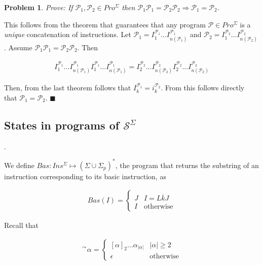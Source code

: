 \documentclass[a4paper, 12pt]{article}
\newtheorem{problem}{Problem}
\newtheorem{problem}{Problem}
\begin{document}
\begin{problem}
    Prove: If $\mathcal{P}_1, \mathcal{P}_2 \in Pro^{\Sigma}$ then $\mathcal{P}_1
    \mathcal{P}_1 = \mathcal{P}_2 \mathcal{P}_2 \Rightarrow \mathcal{P}_1 =
    \mathcal{P}_2$.
\end{problem}

This follows from the theorem that guarantees that any program $\mathcal{P} \in
Pro^{\Sigma}$ is a \textit{unique} concatenation of instructions. Let
$\mathcal{P}_1 = I_1^{\mathcal{P}_1} \ldots I_{n(\mathcal{P}_1)}^{\mathcal{P}_1}$ and $\mathcal{P}_2 = I_1^{\mathcal{P}_2}
\ldots I_{n(\mathcal{P}_2)}^{\mathcal{P}_2}$. Assume $\mathcal{P}_1\mathcal{P}_1 =
\mathcal{P}_2 \mathcal{P}_2$. Then 

\begin{align*}
    I_1^{\mathcal{P}_1} \ldots I_{n(\mathcal{P}_1)}^{\mathcal{P}_1}
    I_1^{\mathcal{P}_1} \ldots I_{n(\mathcal{P}_1)}^{\mathcal{P}_1} = 
    I_2^{\mathcal{P}_2} \ldots I_{n(\mathcal{P}_2)}^{\mathcal{P}_2}
    I_2^{\mathcal{P}_2} \ldots I_{n(\mathcal{P}_2)}^{\mathcal{P}_2}
\end{align*}

Then, from the last theorem follows that $I_k^{\mathcal{P}_1} =
i_k^{\mathcal{P}_2}$. From this follows directly that $\mathcal{P}_1 =
\mathcal{P}_2$. $\blacksquare$

\subsection{States in programs of $\mathcal{S}^{\Sigma}$}.

We define $Bas : Ins^{\Sigma} \mapsto (\Sigma \cup \Sigma_p)^{*}$, the program
that returns the substring of an instruction corresponding to its basic
instruction, as 

\begin{align*}
    Bas(I) = \begin{cases}
        J & I = L \overline{k} J \\ 
        I & \text{otherwise}
    \end{cases}
\end{align*}

Recall that 

\begin{align*}
    {}^{\curvearrowright} \alpha = \begin{cases}
        [\alpha]_2 \ldots \alpha_|\alpha| & |\alpha| \geq 2 \\ 
        \epsilon & \text{otherwise}
    \end{cases}
\end{align*}
\end{document}
